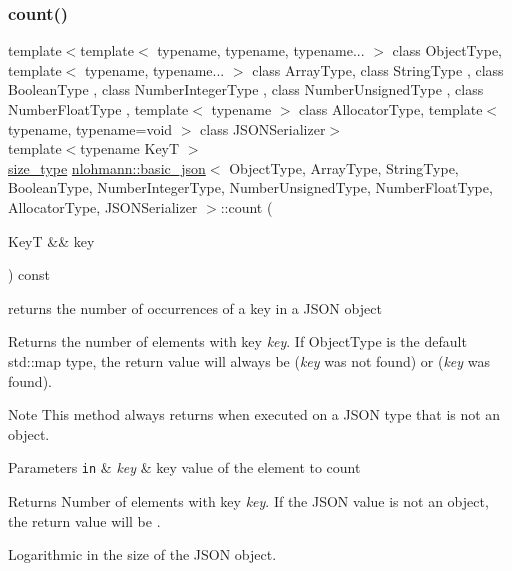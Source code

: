 \subsubsection{\texorpdfstring{count()}{count()}}
{\footnotesize\ttfamily template$<$template$<$ typename, typename, typename... $>$ class Object\+Type, template$<$ typename, typename... $>$ class Array\+Type, class String\+Type , class Boolean\+Type , class Number\+Integer\+Type , class Number\+Unsigned\+Type , class Number\+Float\+Type , template$<$ typename $>$ class Allocator\+Type, template$<$ typename, typename=void $>$ class J\+S\+O\+N\+Serializer$>$ \\
template$<$typename KeyT $>$ \\
\hyperlink{classnlohmann_1_1basic__json_a39f2cd0b58106097e0e67bf185cc519b}{size\+\_\+type} \hyperlink{classnlohmann_1_1basic__json}{nlohmann\+::basic\+\_\+json}$<$ Object\+Type, Array\+Type, String\+Type, Boolean\+Type, Number\+Integer\+Type, Number\+Unsigned\+Type, Number\+Float\+Type, Allocator\+Type, J\+S\+O\+N\+Serializer $>$\+::count (\begin{DoxyParamCaption}\item[{KeyT \&\&}]{key }\end{DoxyParamCaption}) const\hspace{0.3cm}{\ttfamily [inline]}}



returns the number of occurrences of a key in a J\+S\+ON object 

Returns the number of elements with key {\itshape key}. If Object\+Type is the default {\ttfamily std\+::map} type, the return value will always be {} ({\itshape key} was not found) or {} ({\itshape key} was found).

\begin{DoxyNote}{Note}
This method always returns {} when executed on a J\+S\+ON type that is not an object.
\end{DoxyNote}

\begin{DoxyParams}[1]{Parameters}
\mbox{\tt in}  & {\em key} & key value of the element to count\\
\hline
\end{DoxyParams}
\begin{DoxyReturn}{Returns}
Number of elements with key {\itshape key}. If the J\+S\+ON value is not an object, the return value will be {}.
\end{DoxyReturn}
Logarithmic in the size of the J\+S\+ON object.

